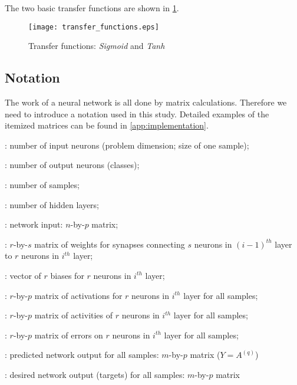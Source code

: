 The two basic transfer functions are shown in \cref{fig:methods:transfer_functions}.

\begin{figure}[H]
  \centering
  \texttt{[image: transfer\_functions.eps]}
  \caption{Transfer functions: \textit{Sigmoid} and \textit{Tanh}}
  \label{fig:methods:transfer_functions}
\end{figure}

\subsection*{Notation}
The work of a neural network is all done by matrix calculations. Therefore we need to introduce a notation used in this study. Detailed examples of the itemized matrices can be found in \cref{app:implementation}.

\begin{description}[leftmargin=!,labelwidth=\widthof{\bfseries $ W^{(i)} $}]
\item[$ n $] : number of input neurons (problem dimension; size of one sample);
\item[$ m $] : number of output neurons (classes);
\item[$ p $] : number of samples;
\item[$ q $] : number of hidden layers;
\item[$ X $] : network input: $ n $-by-$ p $ matrix;
\item[$ W^{(i)} $] : $ r $-by-$ s $ matrix of weights for synapses connecting $ s $ neurons in $ (i-1)^{th} $ layer to $ r $ neurons in $ i^{th} $ layer;
\item[$ B^{(i)} $] : vector of $ r $ biases for $ r $ neurons in $ i^{th} $ layer;
\item[$ Z^{(i)} $] : $ r $-by-$ p $ matrix of activations for $ r $ neurons in $ i^{th} $ layer for all samples;
\item[$ A^{(i)} $] : $ r $-by-$ p $ matrix of activities of $ r $ neurons in $ i^{th} $ layer for all samples;
\item[$ \Delta^{(i)} $] : $ r $-by-$ p $ matrix of errors on $ r $ neurons in $ i^{th} $ layer for all samples;
\item[$ Y $] : predicted network output for all samples: $ m $-by-$ p $ matrix ($ Y = A^{(q)} $)
\item[$ U $] : desired network output (targets) for all samples: $ m $-by-$ p $ matrix
\end{description}

